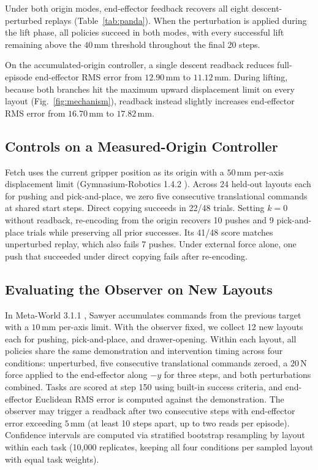 Under both origin modes, end-effector feedback recovers all eight descent-perturbed replays (Table~\ref{tab:panda}). When the perturbation is applied during the lift phase, all policies succeed in both modes, with every successful lift remaining above the $40\,\text{mm}$ threshold throughout the final 20 steps.

On the accumulated-origin controller, a single descent readback reduces full-episode end-effector RMS error from $12.90\,\text{mm}$ to $11.12\,\text{mm}$. During lifting, because both branches hit the maximum upward displacement limit on every layout (Fig.~\ref{fig:mechanism}), readback instead slightly increases end-effector RMS error from $16.70\,\text{mm}$ to $17.82\,\text{mm}$.

\subsection{Controls on a Measured-Origin Controller}

Fetch uses the current gripper position as its origin with a $50\,\text{mm}$ per-axis displacement limit (Gymnasium-Robotics 1.4.2 \citep{ref4}). Across 24 held-out layouts each for pushing and pick-and-place, we zero five consecutive translational commands at shared start steps. Direct copying succeeds in 22/48 trials. Setting $k = 0$ without readback, re-encoding from the origin recovers 10 pushes and 9 pick-and-place trials while preserving all prior successes. Its 41/48 score matches unperturbed replay, which also fails 7 pushes. Under external force alone, one push that succeeded under direct copying fails after re-encoding.

\subsection{Evaluating the Observer on New Layouts}

In Meta-World 3.1.1 \citep{ref7}, Sawyer accumulates commands from the previous target with a $10\,\text{mm}$ per-axis limit. With the observer fixed, we collect 12 new layouts each for pushing, pick-and-place, and drawer-opening. Within each layout, all policies share the same demonstration and intervention timing across four conditions: unperturbed, five consecutive translational commands zeroed, a $20\,\text{N}$ force applied to the end-effector along $-y$ for three steps, and both perturbations combined. Tasks are scored at step 150 using built-in success criteria, and end-effector Euclidean RMS error is computed against the demonstration. The observer may trigger a readback after two consecutive steps with end-effector error exceeding $5\,\text{mm}$ (at least 10 steps apart, up to two reads per episode). Confidence intervals are computed via stratified bootstrap resampling by layout within each task (10,000 replicates, keeping all four conditions per sampled layout with equal task weights).

